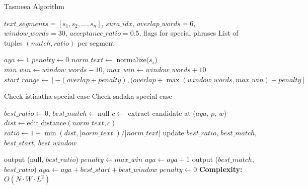 \begin{algorithm}[H]
\caption{Tasmeea Algorithm}
\label{alg:tasmeea}
\begin{algorithmic}[1]
\REQUIRE $text\_segments = [s_1, s_2, \dots, s_n]$, $sura\_idx$, 
          $overlap\_words = 6$, $window\_words = 30$, 
          $acceptance\_ratio = 0.5$, flags for special phrases
\ENSURE List of tuples $(match, ratio)$ per segment

\STATE $aya \leftarrow 1$ 
\STATE $penalty \leftarrow 0$
    \STATE $norm\_text \leftarrow$ normalize($s_i$) 
    \STATE $min\_win \leftarrow window\_words - 10$, $max\_win \leftarrow window\_words + 10$
    \STATE $start\_range \leftarrow [-(overlap + penalty), (overlap + \max(window\_words, max\_win) + penalty]$
    
        \STATE Check istiaatha special case
        \STATE Check sadaka special case
    \ENDIF
    
    \STATE $best\_ratio \leftarrow 0$, $best\_match \leftarrow \text{null}$
            \STATE $c \leftarrow$ extract candidate at ($aya$, $p$, $w$)
            \STATE $dist \leftarrow \text{edit\_distance}(norm\_text, c)$
            \STATE $ratio \leftarrow 1 - \min(dist, |norm\_text|) / |norm\_text|$
                \STATE update $best\_ratio$, $best\_match$, $best\_start$, $best\_window$
            \ENDIF
        \ENDFOR
    \ENDFOR
    
        \STATE output (null, $best\_ratio$)
        \STATE $penalty \leftarrow max\_win$
        \STATE $aya \leftarrow aya + 1$ 
    \ELSE
        \STATE output ($best\_match$, $best\_ratio$)
        \STATE $aya \leftarrow aya + best\_start + best\_window$
        \STATE $penalty \leftarrow 0$
    \ENDIF
\ENDFOR
\STATE \textbf{Complexity:} $O(N \cdot W \cdot L^2)$ 
\end{algorithmic}
\end{algorithm}
